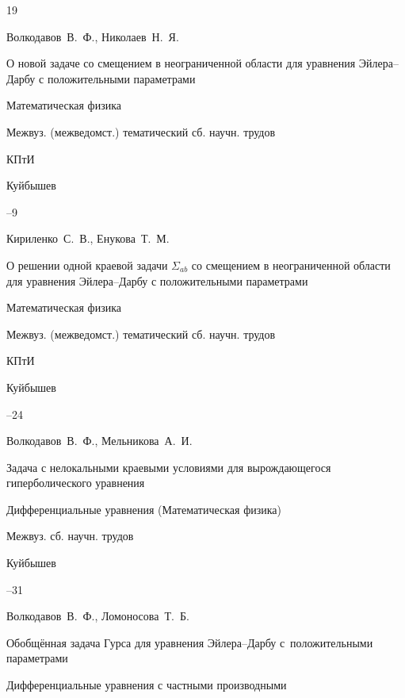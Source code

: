 \begin{thebibliography}{19}

\by Волкодавов~В.~Ф., Николаев~Н.~Я.

\paper О новой задаче со смещением в неограниченной области для уравнения Эйлера--Дарбу с положительными параметрами

\inbook Математическая физика

\bookinfo Межвуз. (межведомст.) тематический сб. научн. трудов

\publ КПтИ

\publaddr Куйбышев 


--9




\by Кириленко~С.~В., Енукова~Т.~М.

\paper О решении одной краевой задачи $\Sigma_{ab}$ со смещением в неограниченной области для уравнения Эйлера--Дарбу с положительными параметрами

\inbook Математическая физика

\bookinfo Межвуз. (межведомст.) тематический сб. научн. трудов

\publ КПтИ

\publaddr Куйбышев 


--24






\by Волкодавов~В.~Ф., Мельникова~А.~И.

\paper Задача с нелокальными краевыми условиями для вырождающегося гиперболического уравнения

\inbook Дифференциальные уравнения (Математическая физика)

\bookinfo Межвуз. сб. научн. трудов


\publaddr Куйбышев 


--31




\by Волкодавов~В.~Ф., Ломоносова~Т.~Б.

\paper Обобщённая задача Гурса для уравнения Эйлера--Дарбу с~положительными параметрами

\inbook Дифференциальные уравнения с частными производными


\end{thebibliography}
